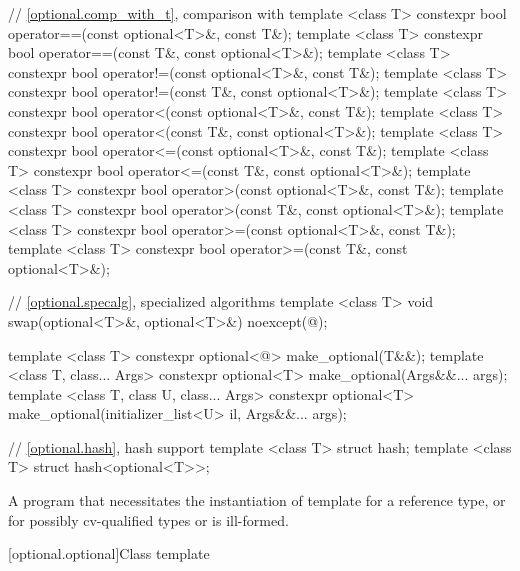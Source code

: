 \begin{codeblock}
{  // \ref{optional.comp_with_t}, comparison with 
  template <class T> constexpr bool operator==(const optional<T>&, const T&);
  template <class T> constexpr bool operator==(const T&, const optional<T>&);
  template <class T> constexpr bool operator!=(const optional<T>&, const T&);
  template <class T> constexpr bool operator!=(const T&, const optional<T>&);
  template <class T> constexpr bool operator<(const optional<T>&, const T&);
  template <class T> constexpr bool operator<(const T&, const optional<T>&);
  template <class T> constexpr bool operator<=(const optional<T>&, const T&);
  template <class T> constexpr bool operator<=(const T&, const optional<T>&);
  template <class T> constexpr bool operator>(const optional<T>&, const T&);
  template <class T> constexpr bool operator>(const T&, const optional<T>&);
  template <class T> constexpr bool operator>=(const optional<T>&, const T&);
  template <class T> constexpr bool operator>=(const T&, const optional<T>&);

  // \ref{optional.specalg}, specialized algorithms
  template <class T>
    void swap(optional<T>&, optional<T>&) noexcept(@\seebelow@);

  template <class T>
    constexpr optional<@\seebelow@> make_optional(T&&);
  template <class T, class... Args>
    constexpr optional<T> make_optional(Args&&... args);
  template <class T, class U, class... Args>
    constexpr optional<T> make_optional(initializer_list<U> il, Args&&... args);

  // \ref{optional.hash}, hash support
  template <class T> struct hash;
  template <class T> struct hash<optional<T>>;
}
\end{codeblock}

\pnum
A program that necessitates the instantiation of template  for
a reference type, or for possibly cv-qualified types  or
 is ill-formed.

[optional.optional]{Class template }

